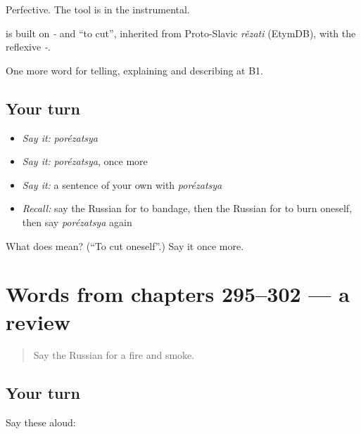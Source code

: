 Perfective. The tool is in the instrumental.

\begin{cousinweb}
\emph{} is built on \emph{-} and \emph{} \textquotedblleft{}to cut\textquotedblright{}, inherited from Proto-Slavic \emph{rězati} (EtymDB), with the reflexive \emph{-}.
\end{cousinweb}

\begin{grammarlens}[title={What you've built}]
One more word for telling, explaining and describing at B1.
\end{grammarlens}

\subsection*{Your turn}
\begin{itemize}
\raggedright
  \item \emph{Say it:} \emph{porézatsya}
  \item \emph{Say it:} \emph{porézatsya}, once more
  \item \emph{Say it:} a sentence of your own with \emph{porézatsya}
  \item \emph{Recall:} say the Russian for to bandage, then the Russian for to burn oneself, then say \emph{porézatsya} again
\end{itemize}

\begin{tcolorbox}[breakable,colback=teal!4,colframe=teal!35!black,title={Before you move on}]
What does  mean? (\textquotedblleft{}To cut oneself\textquotedblright{}.) Say it once more.
\end{tcolorbox}
\section[(dialogue)]{Words from chapters 295–302 — a review}

\label{lesson:RU-R302-review-295-302}



\begin{quote}
Say the Russian for a fire and smoke.
\end{quote}

\subsection*{Your turn}
Say these aloud:

